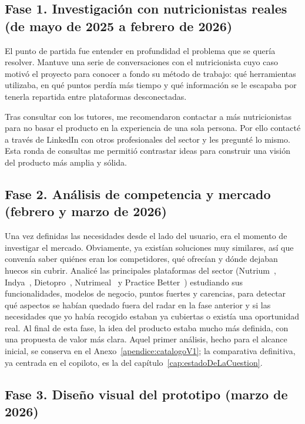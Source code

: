 \subsection*{Fase 1. Investigación con nutricionistas reales (de mayo de 2025 a febrero de 2026)}

El punto de partida fue entender en profundidad el problema que se quería resolver. Mantuve una serie de conversaciones con el nutricionista cuyo caso motivó el proyecto para conocer a fondo su método de trabajo: qué herramientas utilizaba, en qué puntos perdía más tiempo y qué información se le escapaba por tenerla repartida entre plataformas desconectadas.

Tras consultar con los tutores, me recomendaron contactar a más nutricionistas para no basar el producto en la experiencia de una sola persona. Por ello contacté a través de LinkedIn con otros profesionales del sector y les pregunté lo mismo. Esta ronda de consultas me permitió contrastar ideas para construir una visión del producto más amplia y sólida.

\subsection*{Fase 2. Análisis de competencia y mercado (febrero y marzo de 2026)}

Una vez definidas las necesidades desde el lado del usuario, era el momento de investigar el mercado. Obviamente, ya existían soluciones muy similares, así que convenía saber quiénes eran los competidores, qué ofrecían y dónde dejaban huecos sin cubrir. Analicé las principales plataformas del sector (Nutrium~\citep{nutrium}, Indya~\citep{indya}, Dietopro~\citep{dietopro}, Nutrimeal~\citep{nutrimeal} y Practice Better~\citep{practicebetter}) estudiando sus funcionalidades, modelos de negocio, puntos fuertes y carencias, para detectar qué aspectos se habían quedado fuera del radar en la fase anterior y si las necesidades que yo había recogido estaban ya cubiertas o existía una oportunidad real. Al final de esta fase, la idea del producto estaba mucho más definida, con una propuesta de valor más clara. Aquel primer análisis, hecho para el alcance inicial, se conserva en el Anexo~\ref{apendice:catalogoV1}; la comparativa definitiva, ya centrada en el copiloto, es la del capítulo~\ref{cap:estadoDeLaCuestion}.

\subsection*{Fase 3. Diseño visual del prototipo (marzo de 2026)}

